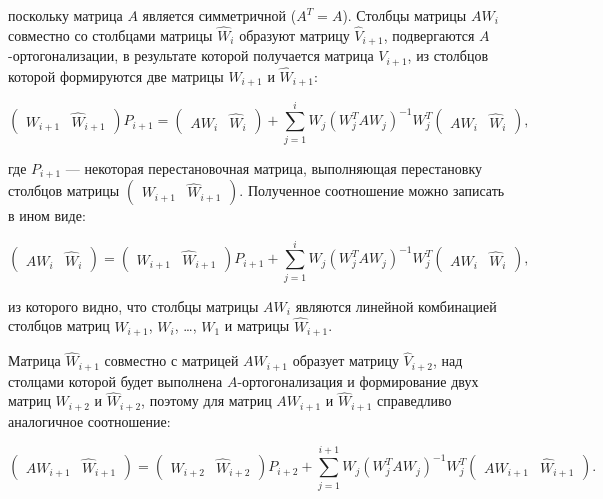 поскольку матрица $A$ является симметричной ($A^T = A$). Столбцы матрицы $A W_i$ совместно со столбцами матрицы $\widehat{W}_i$
образуют матрицу $\widehat{V}_{i+1}$, подвергаются $A$-ортогонализации, в результате которой получается матрица $V_{i+1}$,
из столбцов которой формируются две матрицы $W_{i+1}$ и $\widehat{W}_{i+1}$:

$$
	\begin{pmatrix}
		W_{i+1} & \widehat{W}_{i+1}
	\end{pmatrix}
	P_{i+1}
	=
	\begin{pmatrix}
		A W_i & \widehat{W}_i
	\end{pmatrix}
	+
	\sum_{j=1}^i W_j \left ( W_j^T A W_j \right ) ^{-1} W_j^T \begin{pmatrix}	A W_i & \widehat{W}_i \end{pmatrix},
$$

где $P_{i+1}$ --- некоторая перестановочная матрица, выполняющая перестановку столбцов матрицы
$\begin{pmatrix} W_{i+1} & \widehat{W}_{i+1} \end{pmatrix}$. Полученное соотношение можно записать в ином виде:

$$
	\begin{pmatrix}
		A W_i & \widehat{W}_i
	\end{pmatrix}
	=
	\begin{pmatrix}
		W_{i+1} & \widehat{W}_{i+1}
	\end{pmatrix}
	P_{i+1}
	+
	\sum_{j=1}^i W_j \left ( W_j^T A W_j \right ) ^{-1} W_j^T \begin{pmatrix} A W_i & \widehat{W}_i \end{pmatrix},
$$

из которого видно, что столбцы матрицы $A W_i$ являются линейной комбинацией столбцов матриц $W_{i+1}$, $W_i$, \dots, $W_1$ и матрицы
$\widehat{W}_{i+1}$.

Матрица $\widehat{W}_{i+1}$ совместно с матрицей $A W_{i+1}$ образует матрицу $\widehat{V}_{i+2}$, над столцами которой будет выполнена
$A$-ортогонализация и формирование двух матриц $W_{i+2}$ и $\widehat{W}_{i+2}$, поэтому для матриц $A W_{i+1}$ и $\widehat{W}_{i+1}$
справедливо аналогичное соотношение:

$$
	\begin{pmatrix}
		A W_{i+1} & \widehat{W}_{i+1}
	\end{pmatrix}
	=
	\begin{pmatrix}
		W_{i+2} & \widehat{W}_{i+2}
	\end{pmatrix}
	P_{i+2}
	+
	\sum_{j=1}^{i+1} W_j \left ( W_j^T A W_j \right ) ^{-1} W_j^T \begin{pmatrix} A W_{i+1} & \widehat{W}_{i+1} \end{pmatrix}
	.
$$


